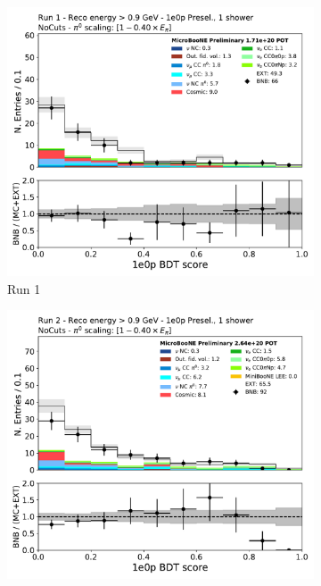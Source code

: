 \begin{figure}[H]
    \centering
    \begin{subfigure}{0.3\textwidth}
    \includegraphics[width=1.0\textwidth]{1e0p/High_E_Sideband/run1/bkg_score.pdf}
    \caption{Run 1}
    \end{subfigure}
    \begin{subfigure}{0.3\textwidth}
    \includegraphics[width=1.0\textwidth]{1e0p/High_E_Sideband/run2/bkg_score.pdf}

\end{subfigure}
\end{figure}
